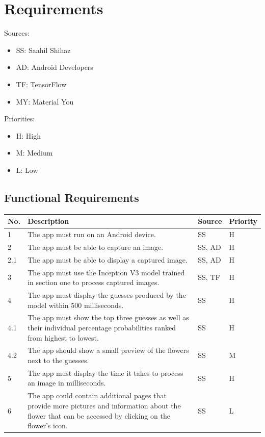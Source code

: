 \documentclass{article}
\begin{document}
\section{Requirements}

Sources:
\begin{itemize}
    \item SS: Saahil Shihaz
    \item AD: Android Developers
    \item TF: TensorFlow
    \item MY: Material You
\end{itemize}

Priorities:
\begin{itemize}
    \item H: High
    \item M: Medium
    \item L: Low
\end{itemize}

\subsection{Functional Requirements}
\label{subsec:funcreq}

\begin{table}[h!]
    \begin{tabular}{ |m{1cm}|m{5cm}|m{1.5cm}|m{1.5cm}| }
        \hline
        No. & Description & Source & Priority \\
        \hline
        1 & 
        The app must run on an Android device.
        & SS & H \\
        \hline
        2 & 
        The app must be able to capture an image.
        & SS, AD & H \\
        \hline
        2.1 & 
        The app must be able to display a captured image. 
        & SS, AD & H \\
        \hline
        3 &
        The app must use the Inception V3 model trained in section one to process captured images. 
        & SS, TF & H \\
        \hline
        4 &
        The app must display the guesses produced by the model within 500 milliseconds.
        & SS & H \\
        \hline
        4.1 &
        The app must show the top three guesses as well as their individual percentage probabilities ranked from highest
        to lowest.
        & SS & H \\
        \hline
        4.2 &
        The app should show a small preview of the flowers next to the guesses.
        & SS & M \\
        \hline
        5 & 
        The app must display the time it takes to process an image in milliseconds.
        & SS & H \\
        \hline
        6 &
        The app could contain additional pages that provide more pictures and information about the flower that can be 
        accessed by clicking on the flower's icon.
        & SS & L \\
        \hline
    \end{tabular}
    \label{table:func}
\end{table}
\break
\end{document}
